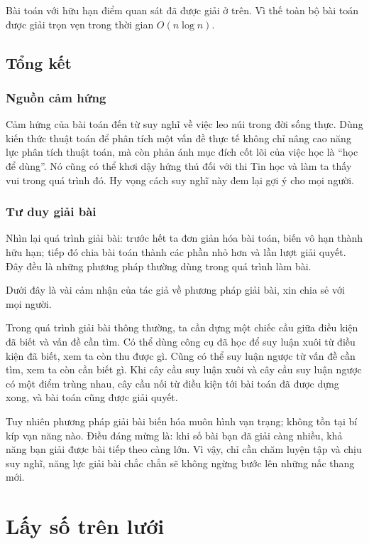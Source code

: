 \documentclass[11pt]{article}
\begin{document}
Bài toán với hữu hạn điểm quan sát đã được giải ở trên. Vì thế toàn bộ bài
toán được giải trọn vẹn trong thời gian \(O(n\log n)\).

\subsection{Tổng kết}

\subsubsection{Nguồn cảm hứng}

Cảm hứng của bài toán đến từ suy nghĩ về việc leo núi trong đời sống thực. Dùng
kiến thức thuật toán để phân tích một vấn đề thực tế không chỉ nâng cao năng
lực phân tích thuật toán, mà còn phản ánh mục đích cốt lõi của việc học là
``học để dùng''. Nó cũng có thể khơi dậy hứng thú đối với thi Tin học và làm
ta thấy vui trong quá trình đó. Hy vọng cách suy nghĩ này đem lại gợi ý cho
mọi người.

\subsubsection{Tư duy giải bài}

Nhìn lại quá trình giải bài: trước hết ta đơn giản hóa bài toán, biến vô hạn
thành hữu hạn; tiếp đó chia bài toán thành các phần nhỏ hơn và lần lượt giải
quyết. Đây đều là những phương pháp thường dùng trong quá trình làm bài.

Dưới đây là vài cảm nhận của tác giả về phương pháp giải bài, xin chia sẻ với
mọi người.

Trong quá trình giải bài thông thường, ta cần dựng một chiếc cầu giữa điều
kiện đã biết và vấn đề cần tìm. Có thể dùng công cụ đã học để suy luận xuôi
từ điều kiện đã biết, xem ta còn thu được gì. Cũng có thể suy luận ngược từ
vấn đề cần tìm, xem ta còn cần biết gì. Khi cây cầu suy luận xuôi và cây cầu
suy luận ngược có một điểm trùng nhau, cây cầu nối từ điều kiện tới bài toán
đã được dựng xong, và bài toán cũng được giải quyết.

Tuy nhiên phương pháp giải bài biến hóa muôn hình vạn trạng; không tồn tại bí
kíp vạn năng nào. Điều đáng mừng là: khi số bài bạn đã giải càng nhiều, khả
năng bạn giải được bài tiếp theo càng lớn. Vì vậy, chỉ cần chăm luyện tập và
chịu suy nghĩ, năng lực giải bài chắc chắn sẽ không ngừng bước lên những nấc
thang mới.

\section{Lấy số trên lưới}
\end{document}
